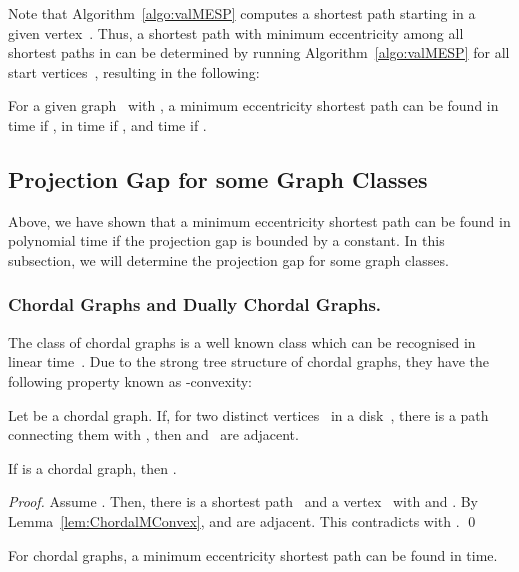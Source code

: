 \documentclass[10pt]{llncs}
\begin{document}
Note that Algorithm~\ref{algo:valMESP} computes a shortest path starting in a given vertex~.
Thus, a shortest path with minimum eccentricity among all shortest paths in  can be determined by running Algorithm~\ref{algo:valMESP} for all start vertices~, resulting in the following:

\begin{theorem}
For a given graph~ with , a  minimum eccentricity shortest path can be found in  time if , in  time if , and  time if .
\end{theorem}

\subsection{Projection Gap for some Graph Classes}

Above, we have shown that a minimum eccentricity shortest path can be found in polynomial time if the projection gap is bounded by a constant.
In this subsection, we will determine the projection gap for some graph classes.

\subsubsection{Chordal Graphs and Dually Chordal Graphs.}

The class of chordal graphs is a well known class which can be recognised in linear time~\cite{TarjanYannak1984}.
Due to the strong tree structure of chordal graphs, they have the following property known as -convexity:

\begin{lemma}
     \label{lem:ChordalMConvex}
Let  be a chordal graph.
If, for two distinct vertices~ in a disk~, there is a path~ connecting them with , then  and~ are adjacent.
\end{lemma}

\begin{lemma}
If  is a chordal graph, then .
\end{lemma}

\begin{proof}
Assume .
Then, there is a shortest path~ and a vertex~ with  and .
By Lemma~\ref{lem:ChordalMConvex},  and  are adjacent.
This contradicts with .
\qed
\end{proof}

\begin{corollary}
For chordal graphs, a minimum eccentricity shortest path can be found in  time.
\end{corollary}
\end{document}
